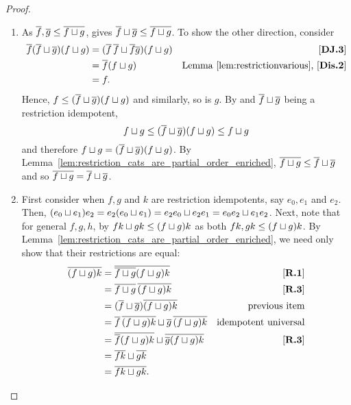 \begin{proof}
  \prepprooflist
  \begin{enumerate}[{(}i{)}]
    \item As $\overline{f}, \overline{g} \le \overline{f\sqcup g}$,  gives
      $\overline{f} \sqcup \overline{g} \le \overline{f \sqcup g}$. To show the other direction, consider
      \begin{align*}
        \overline{f}(\overline{f} \sqcup \overline{g}) (f \sqcup g)
        &= (\overline{f}\,\overline{f} \sqcup \overline{f}\overline{g})(f \sqcup g) &\text{\ensuremath{[\text{\bfseries {DJ}.{3}}]}}\\
        &= \overline{f} (f\sqcup g) &\text{Lemma~\ref{lem:restrictionvarious}, \ensuremath{[\text{\bfseries {Dis}.{2}}]}}\\
        &= f.
      \end{align*}
      Hence, $f \le (\overline{f} \sqcup \overline{g}) (f \sqcup g)$ and similarly, so is $g$. By
       and $\overline{f} \sqcup \overline{g}$ being a restriction idempotent,
      \[
        f \sqcup g \le (\overline{f} \sqcup \overline{g}) (f \sqcup g) \le f \sqcup g
      \]
      and therefore $f \sqcup g = (\overline{f} \sqcup \overline{g}) (f \sqcup g)$. By
      Lemma~\ref{lem:restriction_cats_are_partial_order_enriched}, $\overline{f\sqcup g} \le \overline{f}
      \sqcup \overline{g}$ and so $\overline{f\sqcup g} = \overline{f}\sqcup \overline{g}$.
    \item First consider when $f, g$ and $k$ are restriction idempotents, say $e_0, e_1 $ and $e_2$.
      Then, $(e_0 \sqcup e_1)e_2 = e_2(e_0 \sqcup e_1) = e_2 e_0 \sqcup e_2 e_1 =
      e_0 e_2 \sqcup e_1 e_2$.
      Next, note that for general $f,g,h$, by  $f k \sqcup g k \le (f\sqcup g) k$ as both
      $f k, g k \le (f\sqcup g) k$.
      By Lemma~\ref{lem:restriction_cats_are_partial_order_enriched}, we need only show that their
      restrictions are equal:
      \begin{align*}
        \rst{(f\djoin g)k} &= \rst{\rst{f\djoin g}(f\djoin g) k } & \rone \\
        & = \rst{f\djoin g}\, \rst{(f\djoin g)k } & \rthree\\
        & = (\rst{f}\djoin \rst{g}) \rst{(f\djoin g)k }  & \text{previous item}\\
        & = \rst{f}\,\rst{(f\djoin g)k } \djoin \rst{g}\, \rst{(f\djoin g)k }
          &\text{idempotent universal}\\
        & = \rst{\rst{f} (f\djoin g)k} \djoin \rst{\rst{g} (f\djoin g)k} & \rthree\\
        & = \rst{f k} \djoin \rst{g k}\\
        & = \rst{f k \djoin g k}.

\end{align*}
\end{enumerate}
\end{proof}
